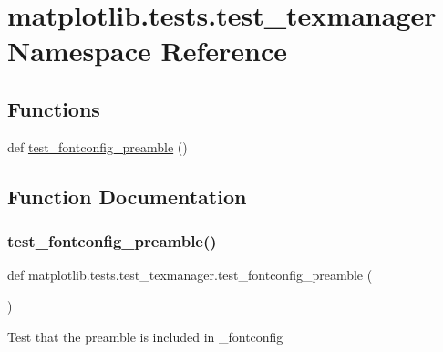 \hypertarget{namespacematplotlib_1_1tests_1_1test__texmanager}{}\section{matplotlib.\+tests.\+test\+\_\+texmanager Namespace Reference}
\label{namespacematplotlib_1_1tests_1_1test__texmanager}
\subsection*{Functions}
\begin{DoxyCompactItemize}
\item 
def \hyperlink{namespacematplotlib_1_1tests_1_1test__texmanager_ad4b130491bbddd98e6522378dec69b43}{test\+\_\+fontconfig\+\_\+preamble} ()
\end{DoxyCompactItemize}


\subsection{Function Documentation}
\mbox{\label{namespacematplotlib_1_1tests_1_1test__texmanager_ad4b130491bbddd98e6522378dec69b43}} 
\subsubsection{\texorpdfstring{test\+\_\+fontconfig\+\_\+preamble()}{test\_fontconfig\_preamble()}}
{\footnotesize\ttfamily def matplotlib.\+tests.\+test\+\_\+texmanager.\+test\+\_\+fontconfig\+\_\+preamble (\begin{DoxyParamCaption}{ }\end{DoxyParamCaption})}

\begin{DoxyVerb}Test that the preamble is included in _fontconfig
\end{DoxyVerb}
 